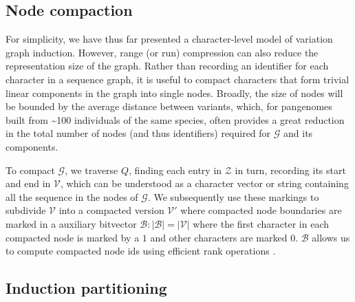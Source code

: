 \documentclass{bioinfo}
\theoremstyle{definition}
\newcommand{\red}[1]{{\textcolor{Red}{#1}}}
\newcommand{\FIXME}[1]{\red{[FIXME: #1]}}
\begin{document}





\subsection{Node compaction}

For simplicity, we have thus far presented a character-level model of variation graph induction.
However, range (or run) compression can also reduce the representation size of the graph.
Rather than recording an identifier for each character in a sequence graph, it is useful to compact characters that form trivial linear components in the graph into single nodes.
Broadly, the size of nodes will be bounded by the average distance between variants, which, for pangenomes built from \textasciitilde100 individuals of the same species, often provides a great reduction in the total number of nodes (and thus identifiers) required for $\mathcal{G}$ and its components.

To compact $\mathcal{G}$, we traverse $Q$, finding each entry in $\mathcal{Z}$ in turn, recording its start and end in $\mathcal{V}$, which can be understood as a character vector or string containing all the sequence in the nodes of $\mathcal{G}$.
We subsequently use these markings to subdivide $\mathcal{V}$ into a compacted version $\mathcal{V}'$ where compacted node boundaries are marked in a auxiliary bitvector $\mathcal{B} : |\mathcal{B}| = |\mathcal{V}|$ where the first character in each compacted node is marked by a $1$ and other characters are marked $0$.
$\mathcal{B}$ allows us to compute compacted node ids using efficient rank operations \citep{Gog_2014}.


\subsection{Induction partitioning}
\label{sec:partitioning}
\end{document}
